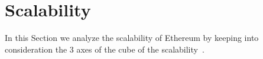 \section{Scalability}
\label{sec:scalability}

In this Section we analyze the scalability of Ethereum by keeping into
consideration the 3 axes of the cube of the
scalability~\cite{bib:art-of-scalability}.


